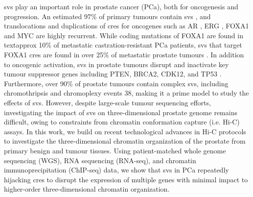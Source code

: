 \glspl{sv} play an important role in prostate cancer (PCa), both for oncogenesis and progression.
An estimated 97\% of primary tumours contain \glspl{sv} \cite{liPatternsSomaticStructural2020,fraserGenomicHallmarksLocalized2017}, and translocations and duplications of \glspl{cre} for oncogenes such as AR \cite{takedaSomaticallyAcquiredEnhancer2018}, ERG \cite{rosenClinicalPotentialERG2012}, FOXA1 \cite{quigleyGenomicHallmarksStructural2018,paroliaDistinctStructuralClasses2019} and MYC \cite{paroliaDistinctStructuralClasses2019} are highly recurrent.
While coding mutations of FOXA1 are found in \\textapprox 10\% of metastatic castration-resistant PCa patients, \glspl{sv} that target FOXA1 \glspl{cre} are found in over 25\% of metastatic prostate tumours \cite{paroliaDistinctStructuralClasses2019}.
In addition to oncogenic activation, \glspl{sv} in prostate tumours disrupt and inactivate key tumour suppressor genes including PTEN, BRCA2, CDK12, and TP53 \cite{quigleyGenomicHallmarksStructural2018,abeshouseMolecularTaxonomyPrimary2015}.
Furthermore, over 90\% of prostate tumours contain complex \glspl{sv}, including chromothripsis and chromoplexy events 38, making it a prime model to study the effects of \glspl{sv}.
However, despite large-scale tumour sequencing efforts, investigating the impact of \glspl{sv} on three-dimensional prostate genome remains difficult, owing to constraints from chromatin conformation capture (i.e. Hi-C) assays.
In this work, we build on recent technological advances in Hi-C protocols to investigate the three-dimensional chromatin organization of the prostate from primary benign and tumour tissues.
Using patient-matched whole genome sequencing (WGS), RNA sequencing (RNA-seq), and chromatin immunoprecipitation (ChIP-seq) data, we show that \glspl{sv} in PCa repeatedly hijacking \glspl{cre} to disrupt the expression of multiple genes with minimal impact to higher-order three-dimensional chromatin organization.
